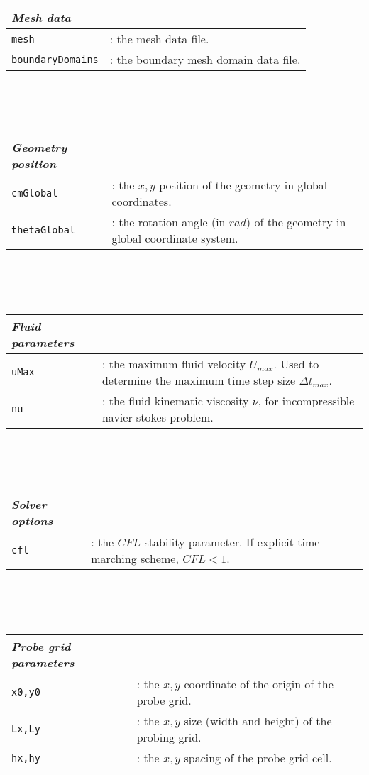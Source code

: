 	\begin{tabular}{lp{10cm}}
				\textit{Mesh data} & \\ \hline
				\texttt{mesh} &: the mesh data file.\\ 
				\texttt{boundaryDomains} &: the boundary mesh domain data file.\\ 			
	\end{tabular}\\ 
    \\ \\
	\begin{tabular}{lp{10cm}}
				\textit{Geometry position} & \\ \hline
				\texttt{cmGlobal} &: the $x,y$ position of the geometry in global coordinates.\\ 
				\texttt{thetaGlobal} &: the rotation angle (in $rad$) of the geometry in global coordinate system.\\ 			
	\end{tabular}\\
    \\ \\
	\begin{tabular}{lp{10cm}}
				\textit{Fluid parameters} & \\ \hline
				\texttt{uMax} &: the maximum fluid velocity $U_{max}$. Used to determine the maximum time step size $\Delta t_{max}$.\\ 
				\texttt{nu} &: the fluid kinematic viscosity $\nu$, for incompressible navier-stokes problem.\\ 			
	\end{tabular}\\	
    \\ \\
	\begin{tabular}{lp{10cm}}
				\textit{Solver options} & \\ \hline
				\texttt{cfl} &: the $CFL$ stability parameter. If explicit time marching scheme, $CFL<1$.\\ 		
	\end{tabular}\\	
    \\ \\
	\begin{tabular}{lp{10cm}}
				\textit{Probe grid parameters} & \\ \hline
				\texttt{x0,y0} &: the $x,y$ coordinate of the origin of the probe grid.\\ 
				\texttt{Lx,Ly} &: the $x,y$ size (width and height) of the probing grid.\\ 			
				\texttt{hx,hy} &: the $x,y$ spacing of the probe grid cell.\\ 							
	\end{tabular}\\	


